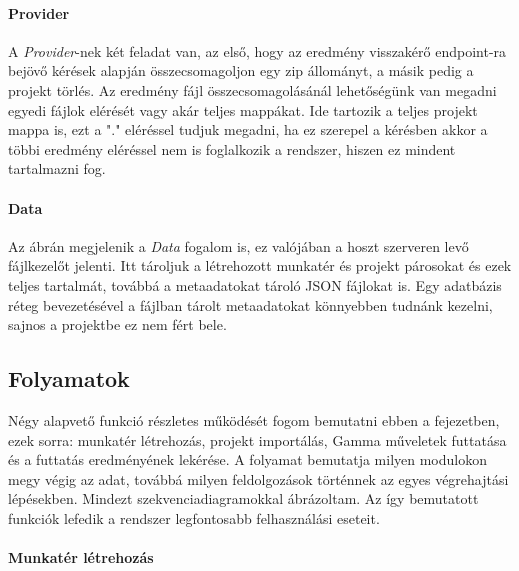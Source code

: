 \paragraph{Provider} A \textit{Provider}-nek két feladat van, az első, hogy az eredmény visszakérő endpoint-ra bejövő kérések alapján összecsomagoljon egy zip állományt, a másik pedig a projekt törlés. Az eredmény fájl összecsomagolásánál lehetőségünk van megadni egyedi fájlok elérését vagy akár teljes mappákat. Ide tartozik a teljes projekt mappa is, ezt a "." eléréssel tudjuk megadni, ha ez szerepel a kérésben akkor a többi eredmény eléréssel nem is foglalkozik a rendszer, hiszen ez mindent tartalmazni fog.
\paragraph{Data} Az ábrán megjelenik a \textit{Data} fogalom is, ez valójában a hoszt szerveren levő fájlkezelőt jelenti. Itt tároljuk a létrehozott munkatér és projekt párosokat és ezek teljes tartalmát, továbbá a metaadatokat tároló JSON fájlokat is. Egy adatbázis réteg bevezetésével a fájlban tárolt metaadatokat könnyebben tudnánk kezelni, sajnos a projektbe ez nem fért bele.



\subsection{Folyamatok}

Négy alapvető funkció részletes működését fogom bemutatni ebben a fejezetben, ezek sorra: munkatér létrehozás, projekt importálás, Gamma műveletek futtatása és a futtatás eredményének lekérése. A folyamat bemutatja milyen modulokon megy végig az adat, továbbá milyen feldolgozások történnek az egyes végrehajtási lépésekben. Mindezt szekvenciadiagramokkal ábrázoltam. Az így bemutatott funkciók lefedik a rendszer legfontosabb felhasználási eseteit.


\paragraph{Munkatér létrehozás}


